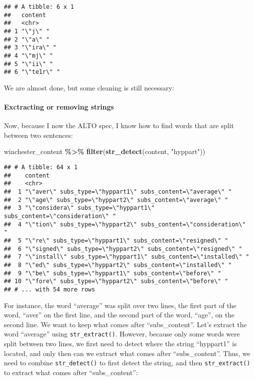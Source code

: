 \documentclass[
]{article}
\newenvironment{Shaded}{\begin{snugshade}}{\end{snugshade}}
\newcommand{\KeywordTok}[1]{\textcolor[rgb]{0.13,0.29,0.53}{\textbf{#1}}}
\newcommand{\NormalTok}[1]{#1}
\newcommand{\OperatorTok}[1]{\textcolor[rgb]{0.81,0.36,0.00}{\textbf{#1}}}
\newcommand{\StringTok}[1]{\textcolor[rgb]{0.31,0.60,0.02}{#1}}
\begin{document}
\begin{verbatim}
## # A tibble: 6 x 1
##   content    
##   <chr>      
## 1 "\"j\" "   
## 2 "\"a\" "   
## 3 "\"ira\" " 
## 4 "\"mj\" "  
## 5 "\"ii\" "  
## 6 "\"te1r\" "
\end{verbatim}

We are almost done, but some cleaning is still necessary:

\hypertarget{exctracting-or-removing-strings}{%
\paragraph{Exctracting or removing strings}\label{exctracting-or-removing-strings}}

Now, because I now the ALTO spec, I know how to find words that are split between two sentences:

\begin{Shaded}
\begin{Highlighting}[]
\NormalTok{winchester\_content }\OperatorTok{\%\textgreater{}\%}\StringTok{ }
\StringTok{  }\KeywordTok{filter}\NormalTok{(}\KeywordTok{str\_detect}\NormalTok{(content, }\StringTok{"hyppart"}\NormalTok{))}
\end{Highlighting}
\end{Shaded}

\begin{verbatim}
## # A tibble: 64 x 1
##    content                                                               
##    <chr>                                                                 
##  1 "\"aver\" subs_type=\"hyppart1\" subs_content=\"average\" "           
##  2 "\"age\" subs_type=\"hyppart2\" subs_content=\"average\" "            
##  3 "\"considera\" subs_type=\"hyppart1\" subs_content=\"consideration\" "
##  4 "\"tion\" subs_type=\"hyppart2\" subs_content=\"consideration\" "     
##  5 "\"re\" subs_type=\"hyppart1\" subs_content=\"resigned\" "            
##  6 "\"signed\" subs_type=\"hyppart2\" subs_content=\"resigned\" "        
##  7 "\"install\" subs_type=\"hyppart1\" subs_content=\"installed\" "      
##  8 "\"ed\" subs_type=\"hyppart2\" subs_content=\"installed\" "           
##  9 "\"be\" subs_type=\"hyppart1\" subs_content=\"before\" "              
## 10 "\"fore\" subs_type=\"hyppart2\" subs_content=\"before\" "            
## # ... with 54 more rows
\end{verbatim}

For instance, the word ``average'' was split over two lines, the first part of the word, ``aver'' on the
first line, and the second part of the word, ``age'', on the second line. We want to keep what comes
after ``subs\_content''. Let's extract the word ``average'' using \texttt{str\_extract()}. However, because only
some words were split between two lines, we first need to detect where the string ``hyppart1'' is
located, and only then can we extract what comes after ``subs\_content''. Thus, we need to combine
\texttt{str\_detect()} to first detect the string, and then \texttt{str\_extract()} to extract what comes after
``subs\_content'':
\end{document}
